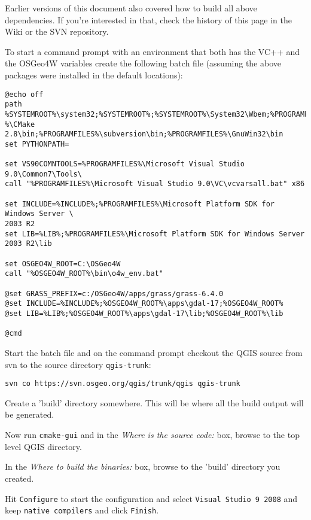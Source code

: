 Earlier versions of this document also covered how to build all above
dependencies.  If you're interested in that, check the history of this page in the Wiki
or the SVN repository.

To start a command prompt with an environment that both has the VC++ and the OSGeo4W
variables create the following batch file (assuming the above packages were
installed in the default locations):

\begin{verbatim}
@echo off
path %SYSTEMROOT%\system32;%SYSTEMROOT%;%SYSTEMROOT%\System32\Wbem;%PROGRAMFILES\
%\CMake 2.8\bin;%PROGRAMFILES%\subversion\bin;%PROGRAMFILES%\GnuWin32\bin
set PYTHONPATH=

set VS90COMNTOOLS=%PROGRAMFILES%\Microsoft Visual Studio 9.0\Common7\Tools\
call "%PROGRAMFILES%\Microsoft Visual Studio 9.0\VC\vcvarsall.bat" x86

set INCLUDE=%INCLUDE%;%PROGRAMFILES%\Microsoft Platform SDK for Windows Server \
2003 R2
set LIB=%LIB%;%PROGRAMFILES%\Microsoft Platform SDK for Windows Server 2003 R2\lib

set OSGEO4W_ROOT=C:\OSGeo4W
call "%OSGEO4W_ROOT%\bin\o4w_env.bat"

@set GRASS_PREFIX=c:/OSGeo4W/apps/grass/grass-6.4.0
@set INCLUDE=%INCLUDE%;%OSGEO4W_ROOT%\apps\gdal-17;%OSGEO4W_ROOT%
@set LIB=%LIB%;%OSGEO4W_ROOT%\apps\gdal-17\lib;%OSGEO4W_ROOT%\lib

@cmd
\end{verbatim}

Start the batch file and on the command prompt checkout the QGIS source from
svn to the source directory \texttt{qgis-trunk}:

\begin{verbatim}
svn co https://svn.osgeo.org/qgis/trunk/qgis qgis-trunk
\end{verbatim}

Create a 'build' directory somewhere. This will be where all the build output
will be generated.

Now run \texttt{cmake-gui} and in the \textit{Where is the source code:} box, browse to
the top level QGIS directory.

In the \textit{Where to build the binaries:} box, browse to the 'build' directory you
created.

Hit \texttt{Configure} to start the configuration and select \texttt{Visual Studio 9 2008}
and keep \texttt{native compilers} and click \texttt{Finish}.

